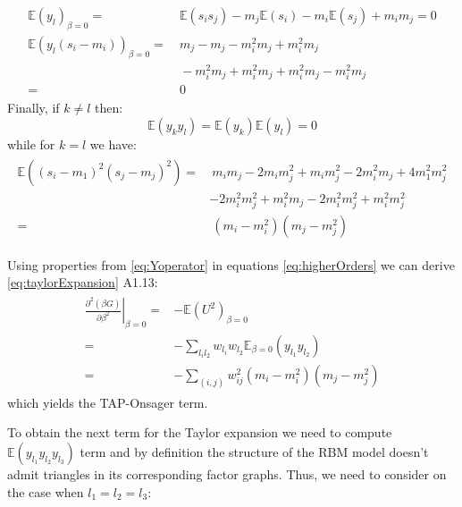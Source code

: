 \documentclass[../report/report.tex]{subfiles}
\begin{document}
\begin{align}
\begin{split}
\mathbb{E}(y_l)_{\beta =0} = & ~\mathbb{E}(s_i s_j) -m_j\mathbb{E}(s_i) - m_i\mathbb{E}(s_j) + m_i m_j = 0 \\
\mathbb{E}(y_l(s_i-m_i))_{\beta =0} = & ~ m_j - m_j -m_i^2m_j + m_i^2m_j \\
 & ~ - m_i^2m_j + m_i^2m_j + m_i^2m_j - m_i^2m_j \\
 = &~ 0
 \end{split}
\end{align}
Finally, if $k \neq l$ then:
$$\mathbb{E}(y_k y_l)= \mathbb{E}(y_k)\mathbb{E}(y_l)=0$$
while for $k = l$ we have:
\begin{align}
\begin{split}
\mathbb{E}((s_i-m_1)^2(s_j-m_j)^2)= & ~m_im_j - 2m_im_j^2 +m_im_j^2 - 2m_i^2m_j + 4m_1^2m_j^2\\
& - 2m_i^2m_j^2 + m_i^2m_j -2m_i^2m_j^2 + m_i^2m_j^2 \\
= & ~ (m_i -m_i^2)(m_j-m_j^2)
\label{eq:Yoperator}
 \end{split}
\end{align}

Using properties from \ref{eq:Yoperator} in equations \ref{eq:higherOrders} we can derive \ref{eq:taylorExpansion}
A1.13:
\begin{align*}
\begin{split}
\left. \frac{\partial^2 (\beta G)}{\partial \beta^2}\right|_{\beta = 0} = & -\mathbb{E}(U^2)_{\beta =0}\\
= & - \sum_{l_i l_2} w_{l_i}w_{l_2} \mathbb{E}_{\beta = 0} (y_{l_1}y_{l_2} ) \\
= & - \sum_{(i,j)} w_{ij}^2 (m_i-m_i^2)(m_j-m_j^2)
\end{split}
\end{align*}
which yields the TAP-Onsager term.


To obtain the next term for the Taylor expansion we need to compute $\mathbb{E}(y_{l_1} y_{l_2} y_{l_3})$ term and by definition the structure of the RBM model doesn't admit triangles in its corresponding factor graphs. Thus, we need to consider on the case when $l_1 = l_2 = l_3$:
\end{document}
